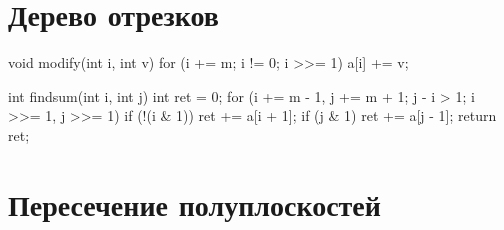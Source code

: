 \documentclass[12pt, titlepage]{article}
\begin{document}
\section{Дерево отрезков}
\begin{cppcode}
void modify(int i, int v)
{
    for (i += m; i != 0; i >>= 1)
        a[i] += v;
}

int findsum(int i, int j)
{
    int ret = 0;
    for (i += m - 1, j += m + 1; j - i > 1; i >>= 1, j >>= 1)
    {
        if (!(i & 1))
            ret += a[i + 1];
        if (j & 1)
            ret += a[j - 1];
    }
    return ret;
}
\end{cppcode}


\section{Пересечение полуплоскостей}
\end{document}
